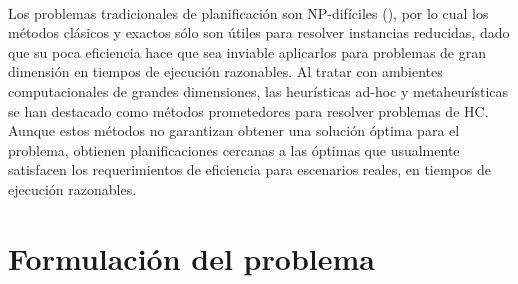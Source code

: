 \paragraph{}Los problemas tradicionales de planificación son NP-difíciles (\citet{bib-garey}), por lo cual los métodos clásicos y exactos sólo son útiles para resolver instancias reducidas, dado que su poca eficiencia hace que sea inviable aplicarlos para problemas de gran dimensión en tiempos de ejecución razonables.
Al tratar con ambientes computacionales de grandes dimensiones, las heurísticas ad-hoc y metaheurísticas se han destacado como métodos prometedores para resolver problemas de HC.
Aunque estos métodos no garantizan obtener una solución óptima para el problema, obtienen planificaciones cercanas a las óptimas que usualmente satisfacen los requerimientos de eficiencia para escenarios reales, en tiempos de ejecución razonables.

\newpage %

\section{Formulación del problema} \label{section:descripcion-problema,subsection:formulacion-problema}


